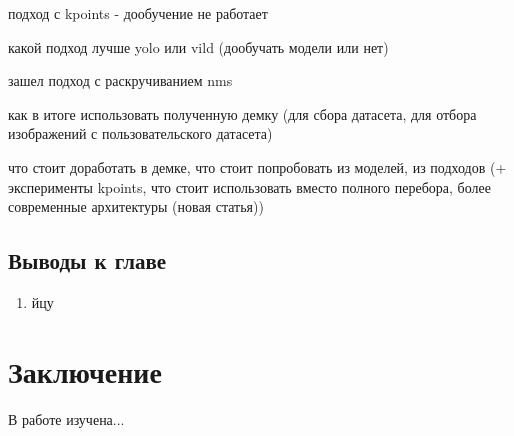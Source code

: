 \documentclass[a4paper,14pt]{article}
\begin{document}
    подход с kpoints - дообучение не работает
    
    какой подход лучше yolo или vild (дообучать модели или нет)
    
    зашел подход с раскручиванием nms
    
    как в итоге использовать полученную демку (для сбора датасета, для отбора изображений с пользовательского датасета)
    
    что стоит доработать в демке, что стоит попробовать из моделей, из подходов (+ эксперименты kpoints, что стоит использовать вместо полного перебора, более современные архитектуры (новая статья))
       
    \subsection{Выводы к главе \thesection}
    \begin{enumerate}
        [1)]
        \itemsep0em
        \item йцу
    \end{enumerate}

    \newpage


    \section{Заключение}

    В работе изучена...

    \newpage
    \renewcommand{\refname}{{\normalsize \hfill Список использованных источников \hfill}}
%    
    
    
    \newpage
\end{document}
